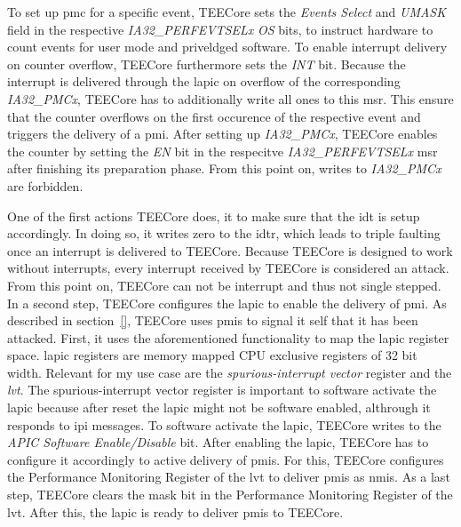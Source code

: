 To set up \gls{pmc} for a specific event, TEECore sets the \textit{Events
    Select} and \textit{UMASK} field in the respective
\textit{IA32\_PERFEVTSELx} \textit{OS} bits, to instruct hardware to count
events for user mode and priveldged software. To enable interrupt delivery
on counter overflow, TEECore furthermore sets the \textit{INT} bit. Because
the interrupt is delivered through the \gls{lapic} on overflow of the
corresponding \textit{IA32\_PMCx}, TEECore has to additionally write all
ones to this \gls{msr}. This ensure that the counter overflows on the first
occurence of the respective event and triggers the delivery of a \gls{pmi}.
After setting up \textit{IA32\_PMCx}, TEECore enables the counter by setting
the \textit{EN} bit in the respecitve \textit{IA32\_PERFEVTSELx} \gls{msr}
after finishing its preparation phase. From this point on, writes to
\textit{IA32\_PMCx} are forbidden.

One of the first actions TEECore does, it to make sure that the \gls{idt} is
setup accordingly. In doing so, it writes zero to the \gls{idtr}, which leads to
triple faulting once an interrupt is delivered to TEECore. Because TEECore is
designed to work without interrupts, every interrupt received by TEECore is
considered an attack. From this point on, TEECore can not be interrupt and thus
not single stepped. In a second step, TEECore configures the \gls{lapic} to
enable the delivery of \gls{pmi}. As described in section~\ref{}\todo{}, TEECore
uses \glspl{pmi} to signal it self that it has been attacked. First, it uses the
aforementioned functionality to map the \gls{lapic} register space. \gls{lapic}
registers are memory mapped CPU exclusive registers of 32 bit width. Relevant
for my use case are the \textit{spurious-interrupt vector} register and the
\textit{\gls{lvt}}. The spurious-interrupt vector register is important to
software activate the \gls{lapic} because after reset the \gls{lapic} might not
be software enabled, althrough it responds to \gls{ipi} messages. To software
activate the \gls{lapic}, TEECore writes to the \textit{APIC Software
    Enable/Disable} bit. After enabling the \gls{lapic}, TEECore has to configure it
accordingly to active delivery of \glspl{pmi}. For this, TEECore configures the
Performance Monitoring Register of the \gls{lvt} to deliver \glspl{pmi} as
\glspl{nmi}. As a last step, TEECore clears the mask bit in the Performance
Monitoring Register of the \gls{lvt}. After this, the \gls{lapic} is ready to
deliver \glspl{pmi} to TEECore.\\

